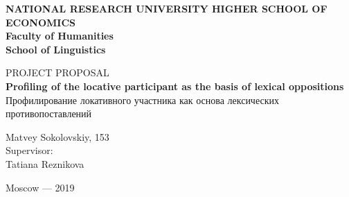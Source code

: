 \thispagestyle{empty}
\begin{center}
\noindent 

\textbf{NATIONAL RESEARCH UNIVERSITY HIGHER SCHOOL OF ECONOMICS}\\
\textbf{Faculty of Humanities}\\
\textbf{School of Linguistics}\\
\vfill

\huge{PROJECT PROPOSAL}\\
\large
\LARGE
\textbf{Profiling of the locative participant as the basis of lexical oppositions}\\
\Large
Профилирование локативного участника как основа лексических противопоставлений\\
\vfill
\vfill
\normalsize
\begin{flushright}
Matvey Sokolovskiy, 153\bigskip\\
                       
Supervisor:\\
Tatiana Reznikova\\

\end{flushright}
\vfill
\begin{center}
Moscow --- 2019
\end{center}

\end{center}
\pagebreak